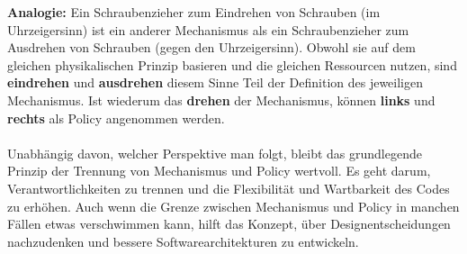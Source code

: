 \documentclass[../vs-script-first-v01.tex]{subfiles}
\begin{document}
\textbf{Analogie:} Ein Schraubenzieher zum Eindrehen von Schrauben (im Uhrzeigersinn) ist ein anderer Mechanismus als ein Schraubenzieher zum Ausdrehen von Schrauben (gegen den Uhrzeigersinn). Obwohl sie auf dem gleichen physikalischen Prinzip basieren und die gleichen Ressourcen nutzen, sind \textbf{eindrehen} und \textbf{ausdrehen} diesem Sinne Teil der Definition des jeweiligen Mechanismus. Ist wiederum das \textbf{drehen} der Mechanismus, können \textbf{links} und \textbf{rechts} als Policy angenommen werden.
\\\\
Unabhängig davon, welcher Perspektive man folgt, bleibt das grundlegende Prinzip der Trennung von Mechanismus und Policy wertvoll.  Es geht darum, Verantwortlichkeiten zu trennen und die Flexibilität und Wartbarkeit des Codes zu erhöhen.  Auch wenn die Grenze zwischen Mechanismus und Policy in manchen Fällen etwas verschwimmen kann, hilft das Konzept, über Designentscheidungen nachzudenken und bessere Softwarearchitekturen zu entwickeln.
\end{document}
